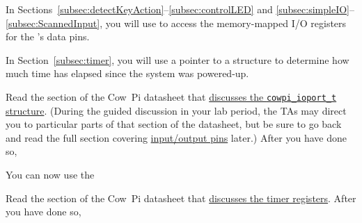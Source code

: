 In Sections~\ref{subsec:detectKeyAction}--\ref{subsec:controlLED} and \ref{subsec:simpleIO}--\ref{subsec:ScannedInput}, you will use
to access the memory-mapped I/O registers for the \processor's data pins.

In Section~\ref{subsec:timer}, you will use a pointer to a
structure to determine how much time has elapsed since the system was powered-up.

Read the section of the Cow~Pi datasheet that \href{https://cow-pi.readthedocs.io/en/latest/CowPi_\lowercaseprocessor/io_registers.html#structure-for-memory-mapped-input-output}{discusses the \lstinline{cowpi_ioport_t} structure}.
(During the guided discussion in your lab period, the TAs may direct you to particular parts of that section of the datasheet,
but be sure to go back and read the full section covering \href{https://cow-pi.readthedocs.io/en/latest/CowPi_\lowercaseprocessor/io_registers.html#external-pins-input-output}{input/output pins} later.)
After you have done so,
\begin{description}
\end{description}



You can now use the


Read the section of the Cow~Pi datasheet that \href{https://cow-pi.readthedocs.io/en/latest/CowPi_\lowercaseprocessor/io_registers.html#timers}{discusses the timer registers}.
After you have done so,
\begin{description}
\end{description}

